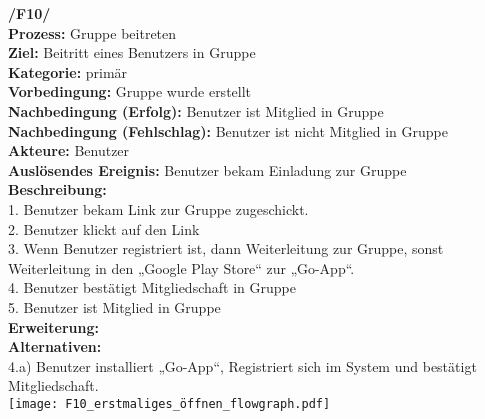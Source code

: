 \textbf{/F10/} \\
\textbf{Prozess:} Gruppe beitreten \\
\textbf{Ziel:} Beitritt eines Benutzers in Gruppe\\
\textbf{Kategorie:} primär \\
\textbf{Vorbedingung:} Gruppe wurde erstellt\\
\textbf{Nachbedingung (Erfolg):} Benutzer ist Mitglied in Gruppe\\
\textbf{Nachbedingung (Fehlschlag):} Benutzer ist nicht Mitglied in Gruppe\\
\textbf{Akteure:} Benutzer\\
\textbf{Auslösendes Ereignis:} Benutzer bekam Einladung zur Gruppe\\
\textbf{Beschreibung:} \\
1. Benutzer bekam Link zur Gruppe zugeschickt.\\
2. Benutzer klickt auf den Link \\
3. Wenn Benutzer registriert ist, dann Weiterleitung zur Gruppe, sonst Weiterleitung in den „Google Play Store“ zur „Go-App“.\\
4. Benutzer bestätigt Mitgliedschaft in Gruppe\\
5. Benutzer ist Mitglied in Gruppe\\
\textbf{Erweiterung:} \\
\textbf{Alternativen:} \\
4.a) Benutzer installiert „Go-App“, Registriert sich im System und bestätigt Mitgliedschaft.\\

\texttt{[image: F10\_erstmaliges\_öffnen\_flowgraph.pdf]}
